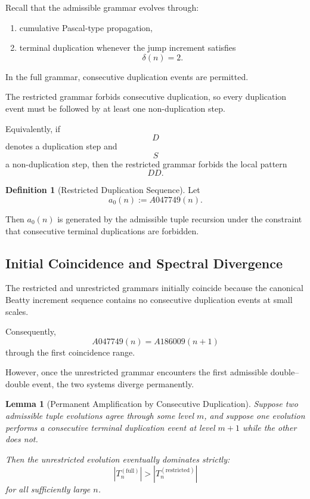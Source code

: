 \documentclass[12pt, oneside]{article}
\numberwithin{equation}{section}
\theoremstyle{definition}
\newtheorem{definition}{Definition}[section]
\theoremstyle{plain}
\newtheorem{lemma}[theorem]{Lemma}
\theoremstyle{remark}
\begin{document}
Recall that the admissible grammar evolves through:
\begin{enumerate}
\item cumulative Pascal-type propagation,
\item terminal duplication whenever the jump increment satisfies
\[
\delta(n)=2.
\]
\end{enumerate}

In the full grammar, consecutive duplication events are permitted.

The restricted grammar forbids consecutive duplication, so every
duplication event must be followed by at least one non-duplication step.

Equivalently, if
\[
D
\]
denotes a duplication step and
\[
S
\]
a non-duplication step, then the restricted grammar forbids the local
pattern
\[
DD.
\]


\begin{definition}[Restricted Duplication Sequence]
Let
\[
a_0(n):=A047749(n).
\]

Then \(a_0(n)\) is generated by the admissible tuple recursion under
the constraint that consecutive terminal duplications are forbidden.
\end{definition}


\subsection{Initial Coincidence and Spectral Divergence}

The restricted and unrestricted grammars initially coincide because the
canonical Beatty increment sequence contains no consecutive duplication
events at small scales.

Consequently,
\[
A047749(n)=A186009(n+1)
\]
through the first coincidence range.

However, once the unrestricted grammar encounters the first admissible
double--double event, the two systems diverge permanently.


\begin{lemma}[Permanent Amplification by Consecutive Duplication]
\label{lem:permanent-amplification}
Suppose two admissible tuple evolutions agree through some level \(m\),
and suppose one evolution performs a consecutive terminal duplication
event at level \(m+1\) while the other does not.

Then the unrestricted evolution eventually dominates strictly:
\[
|T_n^{(\mathrm{full})}|
>
|T_n^{(\mathrm{restricted})}|
\]
for all sufficiently large \(n\).
\end{lemma}
\end{document}
